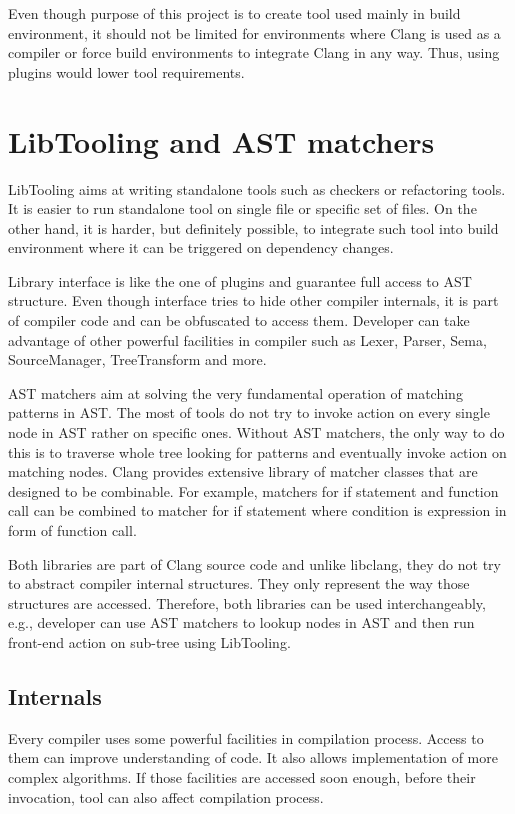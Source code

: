 Even though purpose of this project is to create tool used mainly in build environment, it should not be limited for environments where Clang is used as a compiler or force build environments to integrate Clang in any way. Thus, using plugins would lower tool requirements.

\section{LibTooling and AST matchers}
LibTooling aims at writing standalone tools such as checkers or refactoring tools. It is easier to run standalone tool on single file or specific set of files. On the other hand, it is harder, but definitely possible, to integrate such tool into build environment where it can be triggered on dependency changes.

Library interface is like the one of plugins and guarantee full access to AST structure. Even though interface tries to hide other compiler internals, it is part of compiler code and can be obfuscated to access them. Developer can take advantage of other powerful facilities in compiler such as Lexer, Parser, Sema, SourceManager, TreeTransform and more.

AST matchers aim at solving the very fundamental operation of matching patterns in AST. The most of tools do not try to invoke action on every single node in AST rather on specific ones. Without AST matchers, the only way to do this is to traverse whole tree looking for patterns and eventually invoke action on matching nodes. Clang provides extensive library of matcher classes that are designed to be combinable. For example, matchers for if statement and function call can be combined to matcher for if statement where condition is expression in form of function call.

Both libraries are part of Clang source code and unlike libclang, they do not try to abstract compiler internal structures. They only represent the way those structures are accessed. Therefore, both libraries can be used interchangeably, e.g., developer can use AST matchers to lookup nodes in AST and then run front-end action on sub-tree using LibTooling.

\subsection{Internals}
Every compiler uses some powerful facilities in compilation process. Access to them can improve understanding of code. It also allows implementation of more complex algorithms. If those facilities are accessed soon enough, before their invocation, tool can also affect compilation process.

